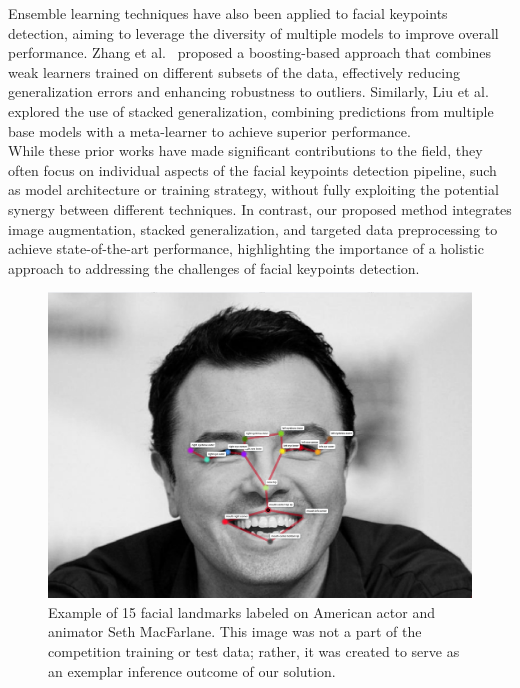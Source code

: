 Ensemble learning techniques have also been applied to facial keypoints detection, aiming to leverage the diversity of multiple models to improve overall performance. Zhang et al.~\cite{wu2017robust} proposed a boosting-based approach that combines weak learners trained on different subsets of the data, effectively reducing generalization errors and enhancing robustness to outliers.  Similarly, Liu et al.~\cite{liu2015deep} explored the use of stacked generalization, combining predictions from multiple base models with a meta-learner to achieve superior performance.\\

While these prior works have made significant contributions to the field, they often focus on individual aspects of the facial keypoints detection pipeline, such as model architecture or training strategy, without fully exploiting the potential synergy between different techniques.  In contrast, our proposed method integrates image augmentation, stacked generalization, and targeted data preprocessing to achieve state-of-the-art performance, highlighting the importance of a holistic approach to addressing the challenges of facial keypoints detection.\\

\begin{figure}[t]
	\centering
	\includegraphics[width=0.95\linewidth]{images/seth.png}
	\caption{Example of 15 facial landmarks labeled on American actor and animator Seth MacFarlane.  This image was not a part of the competition training or test data; rather, it was created to serve as an exemplar inference outcome of our solution.}
	\label{fig:oneexample}
\end{figure}